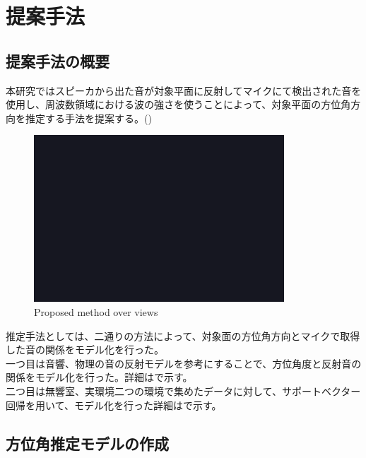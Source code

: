 \section{提案手法}
\label{chap:proposed_method}
\subsection{提案手法の概要}
本研究ではスピーカから出た音が対象平面に反射してマイクにて検出された音を使用し、周波数領域における波の強さを使うことによって、対象平面の方位角方向を推定する手法を提案する。()

\begin{figure}[h]
    \label{fig:proposed_method_overview}
    \centering
    \includegraphics[width=\linewidth]{images/fig_sample.png}
    \caption{Proposed method over views}
\end{figure}

推定手法としては、二通りの方法によって、対象面の方位角方向とマイクで取得した音の関係をモデル化を行った。\\
一つ目は音響、物理の音の反射モデルを参考にすることで、方位角度と反射音の関係をモデル化を行った。詳細はで示す。\\
二つ目は無響室、実環境二つの環境で集めたデータに対して、サポートベクター回帰を用いて、モデル化を行った詳細はで示す。

\subsection{方位角推定モデルの作成}
\label{sec:self_by_myself}

